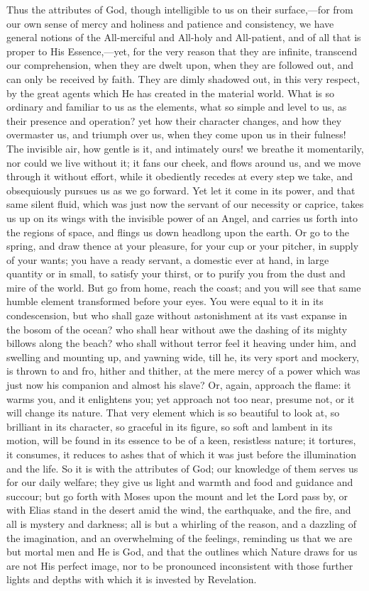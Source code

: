 Thus the attributes of God, though intelligible to us on their
surface,—for from our own sense of mercy and holiness and patience
and consistency, we have general notions of the All-merciful and
All-holy and All-patient, and of all that is proper to His Essence,—yet,
for the very reason that they are infinite, transcend our
comprehension, when they are dwelt upon, when they are followed out,
and can only be received by faith. They are dimly shadowed out, in
this very respect, by the great agents which He has created in the
material world. What is so ordinary and familiar to us as the
elements, what so simple and level to us, as their presence and
operation? yet how their character changes, and how they overmaster
us, and triumph over us, when they come upon us in their fulness! The
invisible air, how gentle is it, and intimately ours! we breathe it
momentarily, nor could we live without it; it fans our cheek, and
flows around us, and we move through it without effort, while it
obediently recedes at every step we take, and obsequiously pursues us
as we go forward. Yet let it come in its power, and that same silent
fluid, which was just now the servant of our necessity or caprice,
takes us up on its wings with the invisible power of an Angel, and
carries us forth into the regions of space, and flings us down
headlong upon the earth. Or go to the spring, and draw thence at your
pleasure, for your cup or your pitcher, in supply of your wants; you
have a ready servant, a domestic ever at hand, in large quantity or in
small, to satisfy your thirst, or to purify you from the dust and mire
of the world. But go from home, reach the coast; and you will see that
same humble element transformed before your eyes. You were equal to it
in its condescension, but who shall gaze without astonishment at its
vast expanse in the bosom of the ocean? who shall hear without awe the
dashing of its mighty billows along the beach? who shall without
terror feel it heaving under him, and swelling and mounting up, and
yawning wide, till he, its very sport and mockery, is thrown to and
fro, hither and thither, at the mere mercy of a power which was just
now his companion and almost his slave? Or, again, approach the flame:
it warms you, and it enlightens you; yet approach not too near,
presume not, or it will change its nature. That very element which is
so beautiful to look at, so brilliant in its character, so graceful in
its figure, so soft and lambent in its motion, will be found in its
essence to be of a keen, resistless nature; it tortures, it consumes,
it reduces to ashes that of which it was just before the illumination
and the life. So it is with the attributes of God; our knowledge of
them serves us for our daily welfare; they give us light and warmth
and food and guidance and succour; but go forth with Moses upon the
mount and let the Lord pass by, or with Elias stand in the desert amid
the wind, the earthquake, and the fire, and all is mystery and
darkness; all is but a whirling of the reason, and a dazzling of the
imagination, and an overwhelming of the feelings, reminding us that we
are but mortal men and He is God, and that the outlines which Nature
draws for us are not His perfect image, nor to be pronounced
inconsistent with those further lights and depths with which it is
invested by Revelation.

